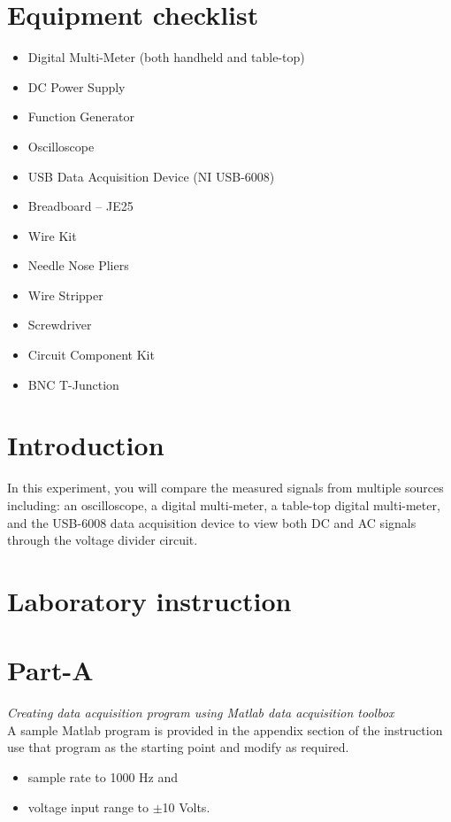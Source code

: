 \documentclass{article} %
\begin{document}
\section{Equipment checklist}
\begin{itemize}
\item	Digital Multi-Meter (both handheld and table-top)
\item	DC Power Supply
\item	Function Generator
\item	Oscilloscope
\item	USB Data Acquisition Device (NI USB-6008) 
\item	Breadboard – JE25
\item	Wire Kit 
\item	Needle Nose Pliers
\item	Wire Stripper
\item	Screwdriver
\item	Circuit Component Kit
\item	BNC T-Junction
\end{itemize}

\section{Introduction}
In this experiment, you will compare the measured signals from multiple sources including: an oscilloscope, a digital multi-meter, a table-top digital multi-meter, and the USB-6008 data acquisition device to view both DC and AC signals through the voltage divider circuit. 


\section{Laboratory instruction}

\section{Part-A}
\emph{Creating data acquisition program using Matlab data acquisition toolbox}\\
A sample Matlab program is provided in the appendix section of the instruction use that program as the starting point and modify as required. 
\begin{itemize}
\item sample rate to 1000 Hz and 
\item voltage input range to $\pm$10 Volts.
\end{itemize}
\end{document}
